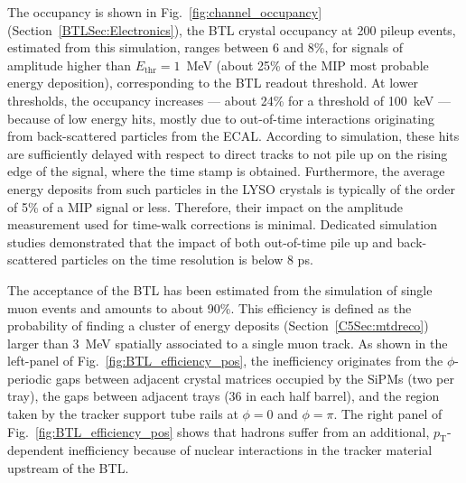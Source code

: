 The occupancy is shown in Fig.~\ref{fig:channel_occupancy} (Section~\ref{BTLSec:Electronics}), the BTL crystal occupancy at 200 pileup events, estimated from this simulation, ranges between 6 and 8\%, for signals of amplitude higher than $E_{\text{thr}} = 1$~MeV (about 25\% of the MIP most probable energy deposition), corresponding to the BTL readout threshold. 
At lower thresholds, the occupancy increases --- about 24\% for a threshold of 100~keV --- because of low energy hits, mostly due to out-of-time interactions originating from back-scattered particles from the ECAL. 
According to simulation, these hits are sufficiently delayed with respect to direct tracks to not pile up on the rising edge of the signal, where the time stamp is obtained. 
Furthermore, the average energy deposits from such particles in the LYSO crystals is typically of the order of 5\% of a MIP signal or less. Therefore, their impact on the amplitude measurement used for time-walk corrections is minimal. 
Dedicated simulation studies demonstrated that the impact of both out-of-time pile up and back-scattered particles on the time resolution is below 8 ps.

The acceptance of the BTL has been estimated from the simulation of single muon events and amounts to about 90\%. This efficiency is defined as the probability of finding a cluster of energy deposits (Section~\ref{C5Sec:mtdreco}) larger than 3~MeV spatially associated to a single muon track. 
As shown in the left-panel of Fig.~\ref{fig:BTL_efficiency_pos}, the inefficiency originates from the $\phi$-periodic gaps between adjacent crystal matrices occupied by the SiPMs (two per tray), the gaps between adjacent trays (36 in each half barrel), and the region taken by the tracker support tube rails at $\phi = 0$ and $\phi = \pi$.  
The right panel of Fig.~\ref{fig:BTL_efficiency_pos} shows that hadrons suffer from an additional, $p_{\text{T}}$-dependent inefficiency because of nuclear interactions in the tracker material upstream of the BTL.

